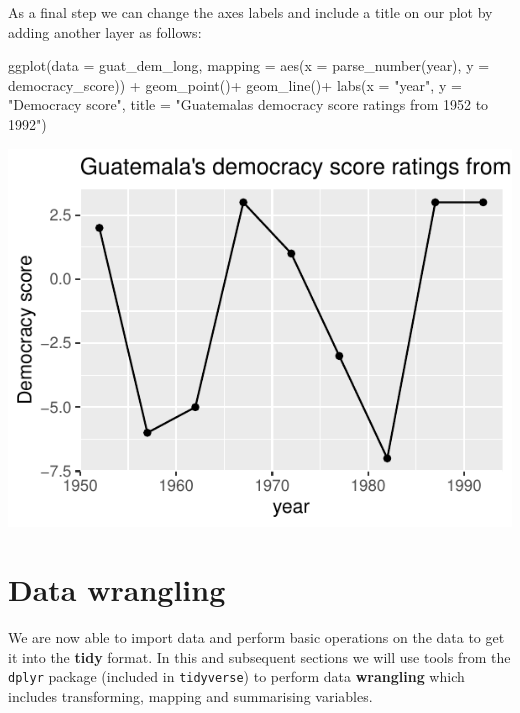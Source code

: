 \documentclass[
  letterpaper,
  DIV=11,
  numbers=noendperiod]{scrartcl}
\newenvironment{Shaded}{\begin{snugshade}}{\end{snugshade}}
\newcommand{\AttributeTok}[1]{\textcolor[rgb]{0.40,0.45,0.13}{#1}}
\newcommand{\FunctionTok}[1]{\textcolor[rgb]{0.28,0.35,0.67}{#1}}
\newcommand{\NormalTok}[1]{\textcolor[rgb]{0.00,0.23,0.31}{#1}}
\newcommand{\SpecialCharTok}[1]{\textcolor[rgb]{0.37,0.37,0.37}{#1}}
\newcommand{\StringTok}[1]{\textcolor[rgb]{0.13,0.47,0.30}{#1}}
\begin{document}
As a final step we can change the axes labels and include a title on our
plot by adding another layer as follows:

\begin{Shaded}
\begin{Highlighting}[]
\FunctionTok{ggplot}\NormalTok{(}\AttributeTok{data =}\NormalTok{ guat\_dem\_long, }\AttributeTok{mapping =} \FunctionTok{aes}\NormalTok{(}\AttributeTok{x =} \FunctionTok{parse\_number}\NormalTok{(year), }\AttributeTok{y =}\NormalTok{ democracy\_score)) }\SpecialCharTok{+}
   \FunctionTok{geom\_point}\NormalTok{()}\SpecialCharTok{+}
   \FunctionTok{geom\_line}\NormalTok{()}\SpecialCharTok{+}
  \FunctionTok{labs}\NormalTok{(}\AttributeTok{x =} \StringTok{"year"}\NormalTok{, }\AttributeTok{y =} \StringTok{"Democracy score"}\NormalTok{,}
       \AttributeTok{title =} \StringTok{"Guatemala\textquotesingle{}s democracy score ratings from 1952 to 1992"}\NormalTok{)}
\end{Highlighting}
\end{Shaded}

\begin{center}
\includegraphics{notes_files/figure-pdf/unnamed-chunk-17-1.pdf}
\end{center}

\section{Data wrangling}\label{wrangling}

We are now able to import data and perform basic operations on the data
to get it into the \textbf{tidy} format. In this and subsequent sections
we will use tools from the \texttt{dplyr} package (included in
\texttt{tidyverse}) to perform data \textbf{wrangling} which includes
transforming, mapping and summarising variables.
\end{document}
